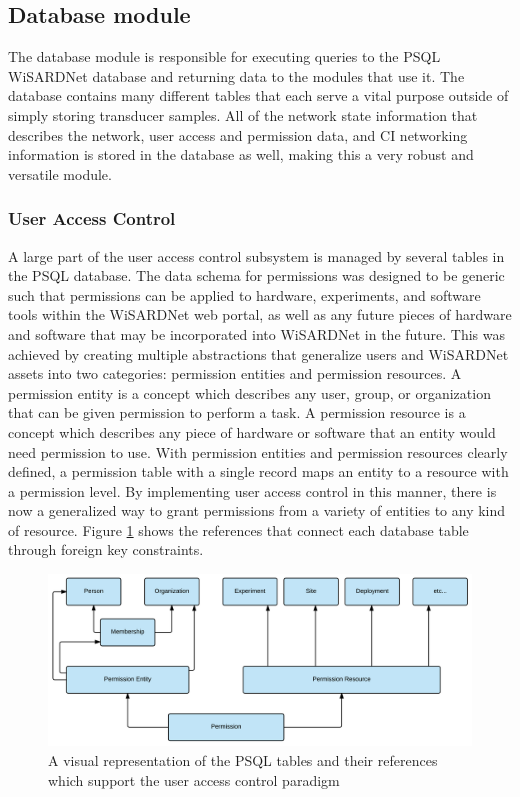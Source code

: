 \subsection{Database module}
The database module is responsible for executing queries to the PSQL WiSARDNet database and returning data to the modules that use it. The database contains many different tables that each serve a vital purpose outside of simply storing transducer samples. All of the network state information that describes the network, user access and permission data, and CI networking information is stored in the database as well, making this a very robust and versatile module.\\

\subsubsection{User Access Control}
A large part of the user access control subsystem is managed by several tables in the PSQL database. The data schema for permissions was designed to be generic such that permissions can be applied to hardware, experiments, and software tools within the WiSARDNet web portal, as well as any future pieces of hardware and software that may be incorporated into WiSARDNet in the future. This was achieved by creating multiple abstractions that generalize users and WiSARDNet assets into two categories: permission entities and permission resources. A permission entity is a concept which describes any user, group, or organization that can be given permission to perform a task. A permission resource is a concept which describes any piece of hardware or software that an entity would need permission to use. With permission entities and permission resources clearly defined, a permission table with a single record maps an entity to a resource with a permission level. By implementing user access control in this manner, there is now a generalized way to grant permissions from a variety of entities to any kind of resource. Figure \ref{fig:user_access_control_tables} shows the references that connect each database table through foreign key constraints.

\begin{figure}[H]
	\centering
	\includegraphics[width=\textwidth]{figures/user_access_control_schema.png}
	\caption{A visual representation of the PSQL tables and their references which support the user access control paradigm}
	\label{fig:user_access_control_tables}
\end{figure}

